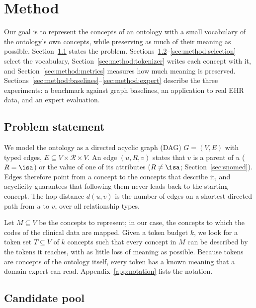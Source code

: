 \section{Method}
\label{sec:method}

Our goal is to represent the concepts of an ontology with a small vocabulary of the ontology's own concepts, while preserving as much of their meaning as possible.
Section~\ref{sec:method:problem} states the problem.
Sections~\ref{sec:method:candidates}--\ref{sec:method:selection} select the vocabulary, Section~\ref{sec:method:tokenizer} writes each concept with it, and Section~\ref{sec:method:metrics} measures how much meaning is preserved.
Sections~\ref{sec:method:baselines}--\ref{sec:method:expert} describe the three experiments: a benchmark against graph baselines, an application to real EHR data, and an expert evaluation.

\subsection{Problem statement}
\label{sec:method:problem}

We model the ontology as a directed acyclic graph (DAG) $G = (V, E)$ with typed edges, $E \subseteq V \times \mathcal{R} \times V$.
An edge $(u, R, v)$ states that $v$ is a parent of $u$ ($R = \isa$) or the value of one of its attributes ($R \neq \isa$; Section~\ref{sec:snomed}).
Edges therefore point from a concept to the concepts that describe it, and acyclicity guarantees that following them never leads back to the starting concept.
The hop distance $d(u, v)$ is the number of edges on a shortest directed path from $u$ to $v$, over all relationship types.

Let $M \subseteq V$ be the concepts to represent; in our case, the concepts to which the codes of the clinical data are mapped.
Given a token budget $k$, we look for a token set $T \subseteq V$ of $k$ concepts such that every concept in $M$ can be described by the tokens it reaches, with as little loss of meaning as possible.
Because tokens are concepts of the ontology itself, every token has a known meaning that a domain expert can read.
Appendix~\ref{app:notation} lists the notation.

\subsection{Candidate pool}
\label{sec:method:candidates}


